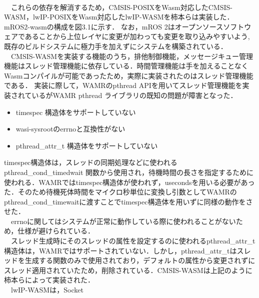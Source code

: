 \\　これらの依存を解消するため，CMSIS-POSIXをWasm対応したCMSIS-WASM，lwIP-POSIXをWasm対応したlwIP-WASMを柿本らは実装した．
mROS2-wasmの構成を図3.1に示す．
なお，mROS 2はオープンソースソフトウェアであることから上位レイヤに変更が加わっても変更を取り込みやすいよう,既存のビルドシステムに極力手を加えずにシステムを構築されている．
\\　CMSIS-WASMを実装する機能のうち，排他制御機能，メッセージキュー管理機能はスレッド管理機能に依存している．時間管理機能は手を加えることなくWasmコンパイルが可能であったため，実際に実装されたのはスレッド管理機能である．
実装に際して，WAMRのpthread APIを用いてスレッド管理機能を実装されているがWAMR pthread ライブラリの既知の問題が障害となった．
\begin{itemize}
    \item timespec 構造体をサポートしていない
    \item wasi-sysrootのerrnoと互換性がない
    \item pthread\_attr\_t 構造体をサポートしていない
\end{itemize}
timespec構造体は，スレッドの同期処理などに使われるpthread\_cond\_timedwait 関数から使用され，待機時間の長さを指定するために使われる．WAMRではtimespec構造体が使われず，usecondsを用いる必要があった．そのため待機死体時間をマイクロ秒単位に変換し引数としてWAMRのpthread\_cond\_timewaitに渡すことでtimespec構造体を用いずに同様の動作をさせた．
\\　errnoに関してはシステムが正常に動作している際に使われることがないため，仕様が避けられている．
\\　スレッド生成時にそのスレッドの属性を設定するのに使われるpthread\_attr\_t構造体は，WAMRではサポートされていない．しかし，pthread\_attr\_tはスレッドを生成する関数のみで使用されており，デフォルトの属性から変更されずにスレッド適用されていたため，削除されている．CMSIS-WASMは上記のように柿本らによって実装された．
\\　lwIP-WASMは，Socket